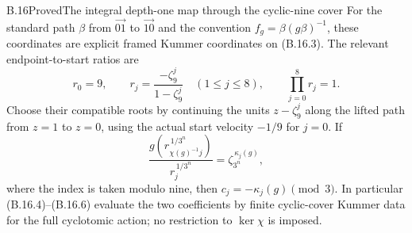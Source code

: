 \begin{statement}{B.16}{Proved}{The integral depth-one map through the cyclic-nine cover}
For the standard path $\beta$ from $\overrightarrow{01}$
to $\overrightarrow{10}$ and the convention
$f_g=\beta(g\beta)^{-1}$, these coordinates are explicit
framed Kummer coordinates on (B.16.3).
The relevant endpoint-to-start ratios are
\[
 r_0=9,\qquad r_j=\frac{-\zeta_9^j}{1-\zeta_9^j}
       \quad(1\leq j\leq8),\qquad \prod_{j=0}^8r_j=1.
                                                               \tag{B.16.5}
\]
Choose their compatible roots by continuing the units
$z-\zeta_9^j$ along the lifted path from $z=1$ to $z=0$,
using the actual start velocity $-1/9$ for $j=0$.
If
\[
 \frac{g(r_{\chi(g)^{-1}j}^{\,1/3^n})}
      {r_j^{\,1/3^n}}
     =\zeta_{3^n}^{\,\kappa_j(g)},                          \tag{B.16.6}
\]
where the index is taken modulo nine, then
$c_j=-\kappa_j(g)\pmod3$.
In particular (B.16.4)--(B.16.6) evaluate the two
coefficients by finite cyclic-cover Kummer data for
the full cyclotomic action; no restriction to
$\ker\chi$ is imposed.
\end{statement}
